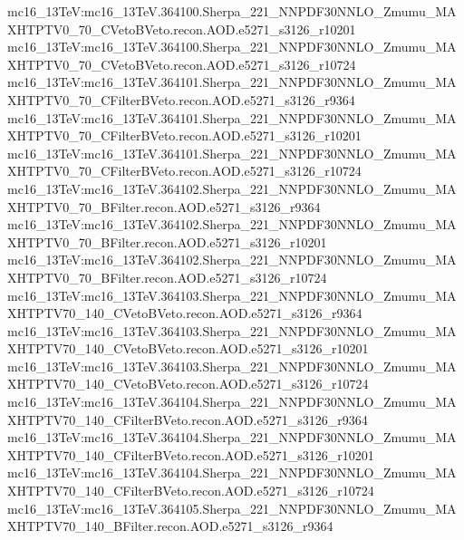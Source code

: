 { mc16\_13TeV:mc16\_13TeV.364100.Sherpa\_221\_NNPDF30NNLO\_Zmumu\_MAXHTPTV0\_70\_CVetoBVeto.recon.AOD.e5271\_s3126\_r10201 \newline    
 mc16\_13TeV:mc16\_13TeV.364100.Sherpa\_221\_NNPDF30NNLO\_Zmumu\_MAXHTPTV0\_70\_CVetoBVeto.recon.AOD.e5271\_s3126\_r10724 \newline    
 mc16\_13TeV:mc16\_13TeV.364101.Sherpa\_221\_NNPDF30NNLO\_Zmumu\_MAXHTPTV0\_70\_CFilterBVeto.recon.AOD.e5271\_s3126\_r9364  \newline   
 mc16\_13TeV:mc16\_13TeV.364101.Sherpa\_221\_NNPDF30NNLO\_Zmumu\_MAXHTPTV0\_70\_CFilterBVeto.recon.AOD.e5271\_s3126\_r10201 \newline    
 mc16\_13TeV:mc16\_13TeV.364101.Sherpa\_221\_NNPDF30NNLO\_Zmumu\_MAXHTPTV0\_70\_CFilterBVeto.recon.AOD.e5271\_s3126\_r10724 \newline    
 mc16\_13TeV:mc16\_13TeV.364102.Sherpa\_221\_NNPDF30NNLO\_Zmumu\_MAXHTPTV0\_70\_BFilter.recon.AOD.e5271\_s3126\_r9364 \newline   
 mc16\_13TeV:mc16\_13TeV.364102.Sherpa\_221\_NNPDF30NNLO\_Zmumu\_MAXHTPTV0\_70\_BFilter.recon.AOD.e5271\_s3126\_r10201 \newline    
 mc16\_13TeV:mc16\_13TeV.364102.Sherpa\_221\_NNPDF30NNLO\_Zmumu\_MAXHTPTV0\_70\_BFilter.recon.AOD.e5271\_s3126\_r10724 \newline    
 mc16\_13TeV:mc16\_13TeV.364103.Sherpa\_221\_NNPDF30NNLO\_Zmumu\_MAXHTPTV70\_140\_CVetoBVeto.recon.AOD.e5271\_s3126\_r9364  \newline   
 mc16\_13TeV:mc16\_13TeV.364103.Sherpa\_221\_NNPDF30NNLO\_Zmumu\_MAXHTPTV70\_140\_CVetoBVeto.recon.AOD.e5271\_s3126\_r10201  \newline   
 mc16\_13TeV:mc16\_13TeV.364103.Sherpa\_221\_NNPDF30NNLO\_Zmumu\_MAXHTPTV70\_140\_CVetoBVeto.recon.AOD.e5271\_s3126\_r10724 \newline    
 mc16\_13TeV:mc16\_13TeV.364104.Sherpa\_221\_NNPDF30NNLO\_Zmumu\_MAXHTPTV70\_140\_CFilterBVeto.recon.AOD.e5271\_s3126\_r9364  \newline   
 mc16\_13TeV:mc16\_13TeV.364104.Sherpa\_221\_NNPDF30NNLO\_Zmumu\_MAXHTPTV70\_140\_CFilterBVeto.recon.AOD.e5271\_s3126\_r10201 \newline    
 mc16\_13TeV:mc16\_13TeV.364104.Sherpa\_221\_NNPDF30NNLO\_Zmumu\_MAXHTPTV70\_140\_CFilterBVeto.recon.AOD.e5271\_s3126\_r10724  \newline   
 mc16\_13TeV:mc16\_13TeV.364105.Sherpa\_221\_NNPDF30NNLO\_Zmumu\_MAXHTPTV70\_140\_BFilter.recon.AOD.e5271\_s3126\_r9364 \newline    
}
